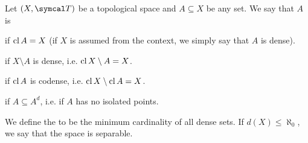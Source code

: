 \begin{definition}\label{def:topologically_dense_set}\cite[25]{Engelking1989}
  Let \( (X, \Cal{T}) \) be a topological space and \( A \subseteq X \) be any set. We say that \( A \) is

  \begin{defenum}
    \item\label{def:topologically_dense_set/dense}  if \( \operatorname{cl}{A} = X \) (if \( X \) is assumed from the context, we simply say that \( A \) is dense).

    \item\label{def:topologically_dense_set/codense}  if \( X \setminus A \) is dense, i.e. \( \operatorname{cl}{X \setminus A} = X \).

    \item\label{def:topologically_dense_set/nowhere_dense}  if \( \operatorname{cl}{A} \) is codense, i.e. \( \operatorname{cl}{X \setminus \operatorname{cl}{A}} = X \).

    \item\label{def:topologically_dense_set/dense_in_itself}  if \( A \subseteq A^d \), i.e. if \( A \) has no isolated points.
  \end{defenum}

  We define the  to be the minimum cardinality of all dense sets. If \( d(X) \leq \aleph_0 \), we say that the space is separable.
\end{definition}
